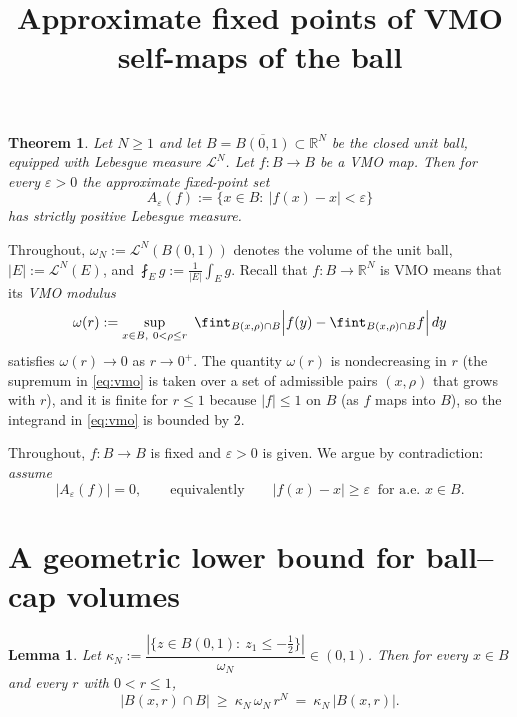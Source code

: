 \documentclass{amsart}
\newtheorem{theorem}{Theorem}
\newtheorem{lemma}{Lemma}
\theoremstyle{definition}
\begin{document}
\title{Approximate fixed points of VMO self-maps of the ball}
\maketitle

\begin{theorem}
Let $N\ge 1$ and let $B=\overline{B(0,1)}\subset\mathbb{R}^N$ be the closed unit
ball, equipped with Lebesgue measure $\mathcal{L}^N$. Let $f:B\to B$ be a VMO map.
Then for every $\varepsilon>0$ the approximate fixed-point set
\[
A_\varepsilon(f):=\{x\in B:\ |f(x)-x|<\varepsilon\}
\]
has strictly positive Lebesgue measure.
\end{theorem}

Throughout, $\omega_N:=\mathcal{L}^N(B(0,1))$ denotes the volume of the unit ball,
$|E|:=\mathcal{L}^N(E)$, and $\fint_E g:=\frac1{|E|}\int_E g$. Recall that
$f:B\to\mathbb{R}^N$ is VMO means that its \emph{VMO modulus}
\begin{equation}\label{eq:vmo}
\omega(r):=\sup_{\substack{x\in B,\ 0<\rho\le r}}
\ \fint_{B(x,\rho)\cap B}\Bigl|f(y)-\fint_{B(x,\rho)\cap B} f\Bigr|\,dy
\end{equation}
satisfies $\omega(r)\to 0$ as $r\to0^+$. The quantity $\omega(r)$ is nondecreasing
in $r$ (the supremum in \eqref{eq:vmo} is taken over a set of admissible pairs
$(x,\rho)$ that grows with $r$), and it is finite for $r\le 1$ because $|f|\le 1$
on $B$ (as $f$ maps into $B$), so the integrand in \eqref{eq:vmo} is bounded by
$2$.

Throughout, $f:B\to B$ is fixed and $\varepsilon>0$ is given. We argue by
contradiction: \emph{assume}
\begin{equation}\label{eq:assume}
|A_\varepsilon(f)|=0,\qquad\text{equivalently}\qquad
|f(x)-x|\ge\varepsilon\ \text{ for a.e.\ } x\in B.
\end{equation}

\section{A geometric lower bound for ball--cap volumes}

\begin{lemma}\label{lem:cap}
Let $\kappa_N:=\dfrac{|\{z\in B(0,1):\ z_1\le -\tfrac12\}|}{\omega_N}\in(0,1)$.
Then for every $x\in B$ and every $r$ with $0<r\le 1$,
\[
|B(x,r)\cap B|\ \ge\ \kappa_N\,\omega_N\,r^N\ =\ \kappa_N\,|B(x,r)|.
\]
\end{lemma}
\end{document}
